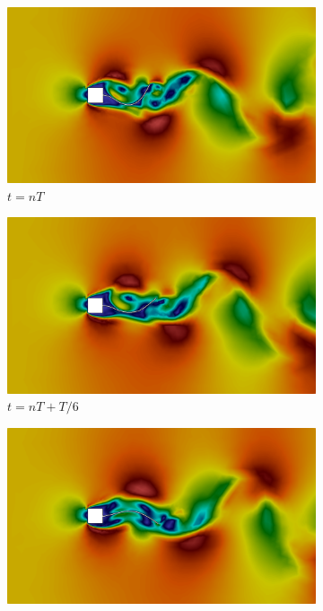 \begin{figure}[h!]
    \centering
    \caption{\textit{Flutter} em painel - Caso 1 - Campo de magnitude de velocidades obtidos no problema de \textit{Flutter} em painel.}
    \begin{subfigure}[b]{0.49\textwidth}
        \includegraphics[width=\linewidth]{Figuras/FSI-prism/vT1.png}
        \caption{$t=nT$}
    \end{subfigure}
    \begin{subfigure}[b]{0.49\textwidth}
        \includegraphics[width=\linewidth]{Figuras/FSI-prism/vT2.png}
        \caption{$t=nT+T/6$}
    \end{subfigure}
    \begin{subfigure}[b]{0.49\textwidth}
        \includegraphics[width=\linewidth]{Figuras/FSI-prism/vT3.png}

\end{subfigure}
\end{figure}

